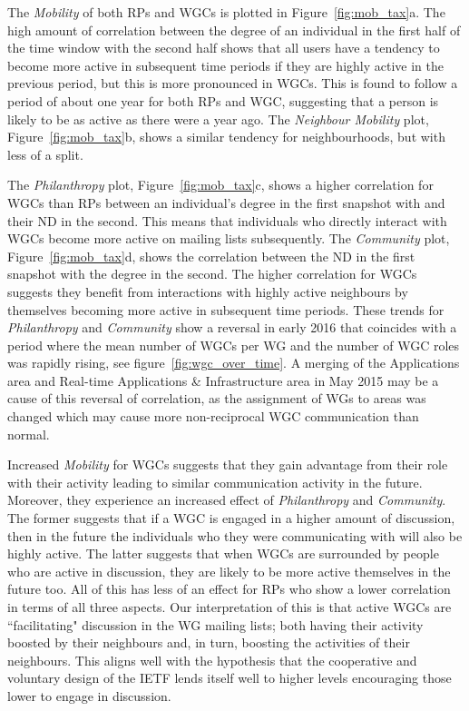 \documentclass[twocolumn,10pt]{article}
\begin{document}
The \textit{Mobility} of both RPs and WGCs is plotted in
Figure~\ref{fig:mob_tax}a. The high amount of correlation between the
degree of an individual in the first half of the time window with the
second half shows that all users have a tendency to become more active in
subsequent time periods if they are highly active in the previous period,
but this is more pronounced in WGCs. This is found to follow a period of
about one year for both RPs and WGC, suggesting that a person is likely to
be as active as there were a year ago. The \textit{Neighbour Mobility}
plot, Figure~\ref{fig:mob_tax}b, shows a similar tendency for
neighbourhoods, but with less of a split.

The \textit{Philanthropy} plot, Figure~\ref{fig:mob_tax}c, shows a higher
correlation for WGCs than RPs between an individual's degree in the first
snapshot with and their ND in the second. This means that individuals who
directly interact with WGCs become more active on mailing lists
subsequently. The \textit{Community} plot, Figure~\ref{fig:mob_tax}d, shows
the correlation between the ND in the first snapshot with the degree in the
second.  The higher correlation for WGCs suggests they benefit from
interactions with highly active neighbours by themselves becoming more
active in subsequent time periods. These trends for \textit{Philanthropy}
and \textit{Community} show a reversal in early 2016 that coincides with a
period where the mean number of WGCs per WG and the number of WGC roles was
rapidly rising, see figure~\ref{fig:wgc_over_time}. A merging of the
Applications area and Real-time Applications \& Infrastructure area in May
2015 may be a cause of this reversal of correlation, as the assignment of
WGs to areas was changed which may cause more non-reciprocal WGC
communication than normal.

Increased \textit{Mobility} for WGCs suggests that they gain advantage from
their role with their activity leading to similar communication activity in
the future. Moreover, they experience an increased effect of
\textit{Philanthropy} and \textit{Community}. The former suggests that if a
WGC is engaged in a higher amount of discussion, then in the future the
individuals who they were communicating with will also be highly active.
The latter suggests that when WGCs are surrounded by people who are active
in discussion, they are likely to be more active themselves in the future
too. All of this has less of an effect for RPs who show a lower correlation
in terms of all three aspects. Our interpretation of this is that active
WGCs are ``facilitating" discussion in the WG mailing lists; both having
their activity boosted by their neighbours and, in turn, boosting the
activities of their neighbours. This aligns well with the hypothesis that
the cooperative and voluntary design of the IETF lends itself well to
higher levels encouraging those lower to engage in discussion. 
\end{document}
